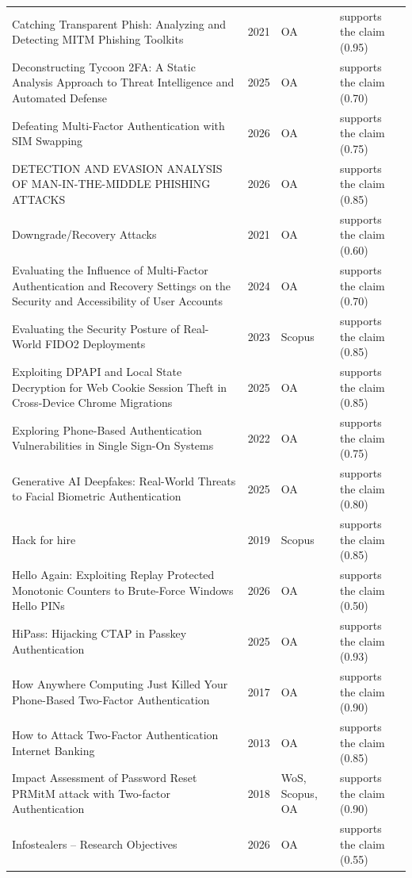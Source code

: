 \begin{longtable}{@{}%
  >{\raggedright\arraybackslash}p{}c%
  >{\raggedright\arraybackslash}p{}%
  >{\raggedright\arraybackslash}p{}@{}}
Catching Transparent Phish: Analyzing and Detecting MITM Phishing Toolkits & 2021 & OA & supports the claim (0.95) \\
Deconstructing Tycoon 2FA: A Static Analysis Approach to Threat Intelligence and Automated Defense & 2025 & OA & supports the claim (0.70) \\
Defeating Multi-Factor Authentication with SIM Swapping & 2026 & OA & supports the claim (0.75) \\
DETECTION AND EVASION ANALYSIS OF MAN-IN-THE-MIDDLE PHISHING ATTACKS & 2026 & OA & supports the claim (0.85) \\
Downgrade/Recovery Attacks & 2021 & OA & supports the claim (0.60) \\
Evaluating the Influence of Multi-Factor Authentication and Recovery Settings on the Security and Accessibility of User Accounts & 2024 & OA & supports the claim (0.70) \\
Evaluating the Security Posture of Real-World FIDO2 Deployments & 2023 & Scopus & supports the claim (0.85) \\
Exploiting DPAPI and Local State Decryption for Web Cookie Session Theft in Cross-Device Chrome Migrations & 2025 & OA & supports the claim (0.85) \\
Exploring Phone-Based Authentication Vulnerabilities in Single Sign-On Systems & 2022 & OA & supports the claim (0.75) \\
Generative AI Deepfakes: Real-World Threats to Facial Biometric Authentication & 2025 & OA & supports the claim (0.80) \\
Hack for hire & 2019 & Scopus & supports the claim (0.85) \\
Hello Again: Exploiting Replay Protected Monotonic Counters to Brute-Force Windows Hello PINs & 2026 & OA & supports the claim (0.50) \\
HiPass: Hijacking CTAP in Passkey Authentication & 2025 & OA & supports the claim (0.93) \\
How Anywhere Computing Just Killed Your Phone-Based Two-Factor Authentication & 2017 & OA & supports the claim (0.90) \\
How to Attack Two-Factor Authentication Internet Banking & 2013 & OA & supports the claim (0.85) \\
Impact Assessment of Password Reset PRMitM attack with Two-factor Authentication & 2018 & WoS, Scopus, OA & supports the claim (0.90) \\
Infostealers -- Research Objectives & 2026 & OA & supports the claim (0.55) \\

\end{longtable}
